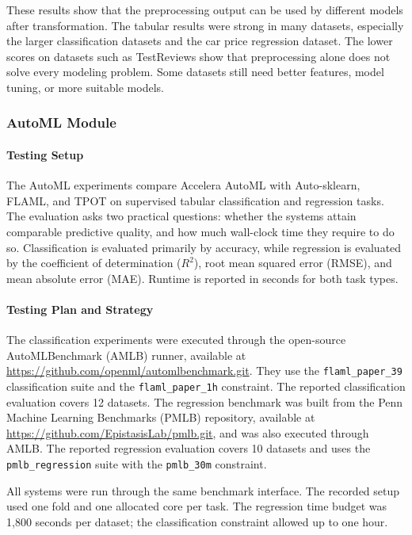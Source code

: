 \documentclass[12pt,a4paper]{report}
\newcommand{\modulepath}[1]{\texttt{#1}}
\begin{document}
\noindent These results show that the preprocessing output can be used by different
models after transformation. The tabular results were strong in many datasets,
especially the larger classification datasets and the car price regression
dataset. The lower scores on datasets such as  TestReviews show
that preprocessing alone does not solve every modeling problem. Some datasets
still need better features, model tuning, or more suitable models.

\subsubsection{AutoML Module}
\paragraph{Testing Setup}
The AutoML experiments compare Accelera AutoML with Auto-sklearn, FLAML, and
TPOT on supervised tabular classification and regression tasks. The evaluation
asks two practical questions: whether the systems attain comparable predictive
quality, and how much wall-clock time they require to do so. Classification is
evaluated primarily by accuracy, while regression is evaluated by the
coefficient of determination ($R^2$), root mean squared error (RMSE), and mean
absolute error (MAE). Runtime is reported in seconds for both task types.

\paragraph{Testing Plan and Strategy}
The classification experiments were executed through the open-source
AutoMLBenchmark (AMLB) runner, available at
\url{https://github.com/openml/automlbenchmark.git}. They use the
\modulepath{flaml\_paper\_39} classification suite and the
\modulepath{flaml\_paper\_1h} constraint. The reported classification
evaluation covers 12 datasets. The regression benchmark was built from the
Penn Machine Learning Benchmarks (PMLB) repository, available at
\url{https://github.com/EpistasisLab/pmlb.git}, and was also executed through
AMLB. The reported regression evaluation covers 10 datasets and uses the
\modulepath{pmlb\_regression} suite with the \modulepath{pmlb\_30m}
constraint.

\noindent All systems were run through the same benchmark interface. The recorded setup
used one fold and one allocated core per task. The regression time budget was
1,800 seconds per dataset; the classification constraint allowed up to one
hour.
\end{document}
